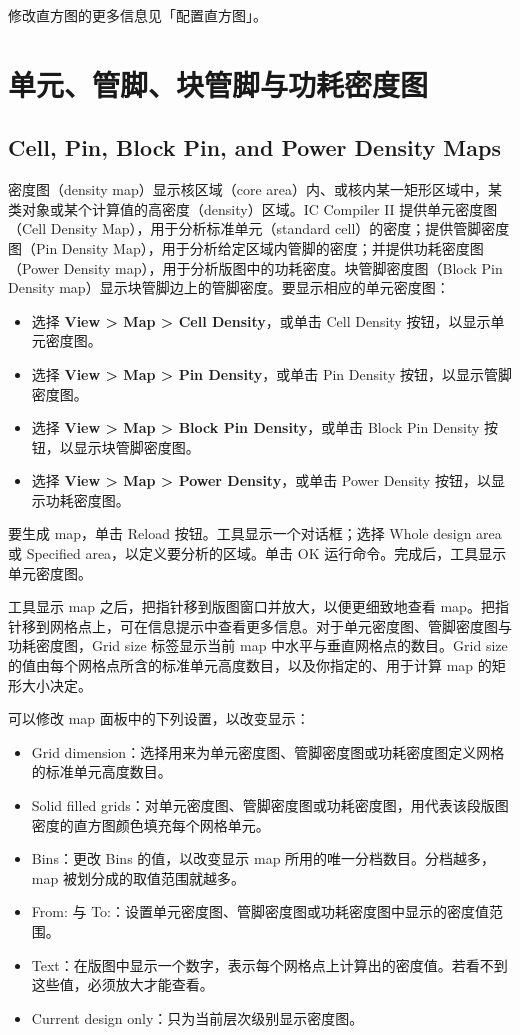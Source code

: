 修改直方图的更多信息见「配置直方图」。

\section{单元、管脚、块管脚与功耗密度图}
\subsection*{Cell, Pin, Block Pin, and Power Density Maps}

密度图（density map）显示核区域（core area）内、或核内某一矩形区域中，某类对象或某个计算值的高密度（density）区域。IC Compiler II 提供单元密度图（Cell Density Map），用于分析标准单元（standard cell）的密度；提供管脚密度图（Pin Density Map），用于分析给定区域内管脚的密度；并提供功耗密度图（Power Density map），用于分析版图中的功耗密度。块管脚密度图（Block Pin Density map）显示块管脚边上的管脚密度。要显示相应的单元密度图：
\begin{itemize}
  \item 选择 \textbf{View > Map > Cell Density}，或单击 Cell Density 按钮，以显示单元密度图。
  \item 选择 \textbf{View > Map > Pin Density}，或单击 Pin Density 按钮，以显示管脚密度图。
  \item 选择 \textbf{View > Map > Block Pin Density}，或单击 Block Pin Density 按钮，以显示块管脚密度图。
  \item 选择 \textbf{View > Map > Power Density}，或单击 Power Density 按钮，以显示功耗密度图。
\end{itemize}

要生成 map，单击 Reload 按钮。工具显示一个对话框；选择 Whole design area 或 Specified area，以定义要分析的区域。单击 OK 运行命令。完成后，工具显示单元密度图。

工具显示 map 之后，把指针移到版图窗口并放大，以便更细致地查看 map。把指针移到网格点上，可在信息提示中查看更多信息。对于单元密度图、管脚密度图与功耗密度图，Grid size 标签显示当前 map 中水平与垂直网格点的数目。Grid size 的值由每个网格点所含的标准单元高度数目，以及你指定的、用于计算 map 的矩形大小决定。

可以修改 map 面板中的下列设置，以改变显示：
\begin{itemize}
  \item Grid dimension：选择用来为单元密度图、管脚密度图或功耗密度图定义网格的标准单元高度数目。
  \item Solid filled grids：对单元密度图、管脚密度图或功耗密度图，用代表该段版图密度的直方图颜色填充每个网格单元。
  \item Bins：更改 Bins 的值，以改变显示 map 所用的唯一分档数目。分档越多，map 被划分成的取值范围就越多。
  \item From: 与 To:：设置单元密度图、管脚密度图或功耗密度图中显示的密度值范围。
  \item Text：在版图中显示一个数字，表示每个网格点上计算出的密度值。若看不到这些值，必须放大才能查看。
  \item Current design only：只为当前层次级别显示密度图。
\end{itemize}

